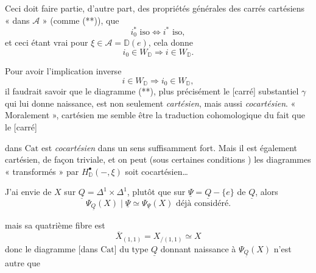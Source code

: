 \documentclass[11pt,a4paper]{article}
\begin{document}
Ceci doit faire partie, d'autre part, des propriétés générales des carrés cartésiens « dans $\mathcal{A}$ »  (comme (**)), que
\[
  i_0^* \text{ iso} \Longleftrightarrow i^* \text{ iso} ,
\]
et ceci étant vrai pour  $\xi \in \mathcal{A} = \mathbb{D}(e)$, cela donne
\[
  i_0 \in W_{\mathbb{D}} \Longrightarrow i \in W_{\mathbb{D}} .
\]


Pour avoir l'implication inverse
\[
  i \in W_{\mathbb{D}} \Longrightarrow i_0 \in W_{\mathbb{D}} ,
\]
il faudrait savoir que le diagramme (**), plus \struck{\ill{}} précisément le  [carré] substantiel $\gamma$ qui lui donne naissance, est non seulement \emph{cartésien}, mais aussi \emph{cocartésien}. « Moralement »,  cartésien me semble être la traduction cohomologique du fait que le  [carré]


dans $\mathrm{Cat}$ est \emph{cocartésien} dans un sens suffisamment fort. Mais il est également cartésien, de façon triviale, et on peut  (sous certaines conditions \ill{})  les diagrammes « transformés » par $H^{\bullet}_{\mathbb{D}}(-, \xi)$ soit cocartésien…

J'ai envie de \ill{} \ill{} \ill{} $X$ \ill{} sur $\underline{Q} = \Delta^1 \times \Delta^1$, plutôt que sur \ill{} $\underline{\Psi} = \underline{Q} - \{e\}$ de $\underline{Q}$, alors
\[
  \Psi_{\underline{Q}}(X) \mid \underline{\Psi} \simeq \Psi_{\underline{\Psi}}(X) \text{ déjà considéré.}
\]

mais sa quatrième fibre est
\[
  \overline{X}_{(1,1)} = X_{/(1,1)} \simeq X
\]
donc le diagramme [dans $\mathrm{Cat}$] du type $\underline{Q}$ donnant naissance à $\Psi_{\underline{Q}}(X)$ n'est autre que
\end{document}
